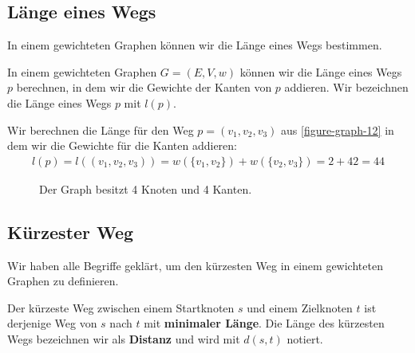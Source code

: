 \subsection{Länge eines Wegs}

In einem gewichteten Graphen können wir die Länge eines Wegs bestimmen.

\begin{definition}
	In einem gewichteten Graphen $G = (E, V, w)$ können wir die Länge eines Wegs $p$ berechnen, in dem wir die Gewichte der Kanten von $p$ addieren. Wir bezeichnen die Länge eines Wegs $p$ mit $l(p)$.
\end{definition}

\begin{example}
	Wir berechnen die Länge für den Weg $p = (v_1, v_2, v_3)$ aus \autoref{figure-graph-12} in dem wir die Gewichte für die Kanten addieren:
\begin{align*}
	l(p) = l((v_1, v_2, v_3)) = w(\{v_1, v_2\}) + w(\{v_2, v_3\}) = 2 + 42 = 44
\end{align*}

\begin{figure}[htb]
\centering
{}
\caption{Der Graph besitzt 4 Knoten und 4 Kanten.}
\label{figure-graph-12}
\end{figure}
\end{example}

\subsection{Kürzester Weg}

Wir haben alle Begriffe geklärt, um den kürzesten Weg in einem gewichteten Graphen zu definieren.

\begin{definition}
Der kürzeste Weg zwischen einem Startknoten $s$ und einem Zielknoten $t$ ist derjenige Weg von $s$ nach $t$ mit \textbf{minimaler Länge}. Die Länge des kürzesten Wegs bezeichnen wir als \textbf{Distanz} und wird mit $d(s, t)$ notiert. 
\end{definition}

